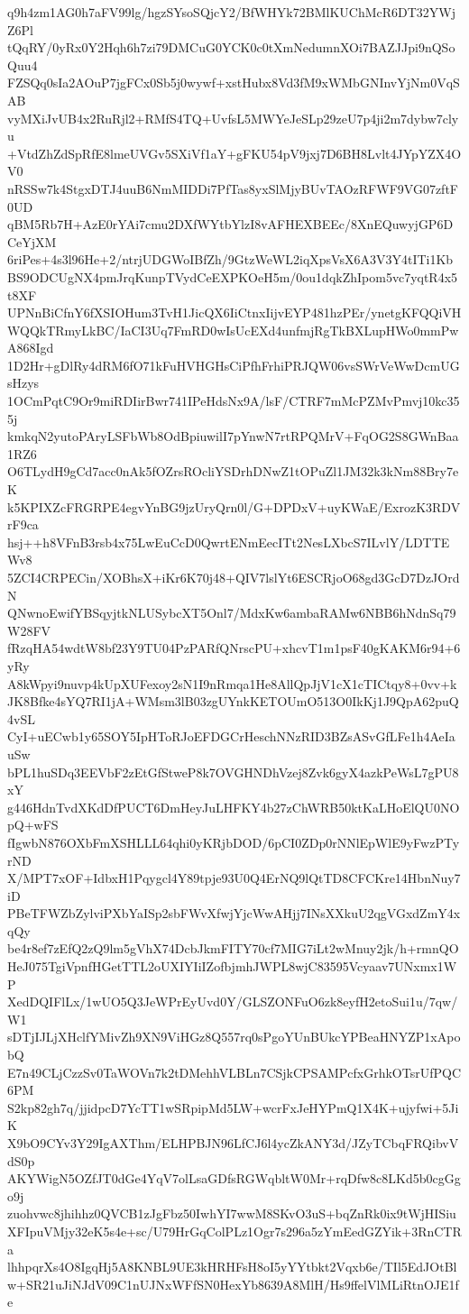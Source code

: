 q9h4zm1AG0h7aFV99lg/hgzSYsoSQjcY2/BfWHYk72BMlKUChMcR6DT32YWjZ6Pl
tQqRY/0yRx0Y2Hqh6h7zi79DMCuG0YCK0c0tXmNedumnXOi7BAZJJpi9nQSoQuu4
FZSQq0sIa2AOuP7jgFCx0Sb5j0wywf+xstHubx8Vd3fM9xWMbGNInvYjNm0VqSAB
vyMXiJvUB4x2RuRjl2+RMfS4TQ+UvfsL5MWYeJeSLp29zeU7p4ji2m7dybw7clyu
+VtdZhZdSpRfE8lmeUVGv5SXiVf1aY+gFKU54pV9jxj7D6BH8Lvlt4JYpYZX4OV0
nRSSw7k4StgxDTJ4uuB6NmMIDDi7PfTas8yxSlMjyBUvTAOzRFWF9VG07zftF0UD
qBM5Rb7H+AzE0rYAi7cmu2DXfWYtbYlzI8vAFHEXBEEc/8XnEQuwyjGP6DCeYjXM
6riPes+4s3l96He+2/ntrjUDGWoIBfZh/9GtzWeWL2iqXpsVsX6A3V3Y4tITi1Kb
BS9ODCUgNX4pmJrqKunpTVydCeEXPKOeH5m/0ou1dqkZhIpom5vc7yqtR4x5t8XF
UPNnBiCfnY6fXSIOHum3TvH1JicQX6IiCtnxIijvEYP481hzPEr/ynetgKFQQiVH
WQQkTRmyLkBC/IaCI3Uq7FmRD0wIsUcEXd4unfmjRgTkBXLupHWo0mmPwA868Igd
1D2Hr+gDlRy4dRM6fO71kFuHVHGHsCiPfhFrhiPRJQW06vsSWrVeWwDcmUGsHzys
1OCmPqtC9Or9miRDIirBwr741IPeHdsNx9A/lsF/CTRF7mMcPZMvPmvj10kc355j
kmkqN2yutoPAryLSFbWb8OdBpiuwilI7pYnwN7rtRPQMrV+FqOG2S8GWnBaa1RZ6
O6TLydH9gCd7acc0nAk5fOZrsROcliYSDrhDNwZ1tOPuZl1JM32k3kNm88Bry7eK
k5KPIXZcFRGRPE4egvYnBG9jzUryQrn0l/G+DPDxV+uyKWaE/ExrozK3RDVrF9ca
hsj++h8VFnB3rsb4x75LwEuCcD0QwrtENmEecITt2NesLXbcS7ILvlY/LDTTEWv8
5ZCI4CRPECin/XOBhsX+iKr6K70j48+QIV7lslYt6ESCRjoO68gd3GcD7DzJOrdN
QNwnoEwifYBSqyjtkNLUSybcXT5Onl7/MdxKw6ambaRAMw6NBB6hNdnSq79W28FV
fRzqHA54wdtW8bf23Y9TU04PzPARfQNrscPU+xhcvT1m1psF40gKAKM6r94+6yRy
A8kWpyi9nuvp4kUpXUFexoy2sN1I9nRmqa1He8AllQpJjV1cX1cTICtqy8+0vv+k
JK8Bfke4sYQ7RI1jA+WMsm3lB03zgUYnkKETOUmO513O0IkKj1J9QpA62puQ4vSL
CyI+uECwb1y65SOY5IpHToRJoEFDGCrHeschNNzRID3BZsASvGfLFe1h4AeIauSw
bPL1huSDq3EEVbF2zEtGfStweP8k7OVGHNDhVzej8Zvk6gyX4azkPeWsL7gPU8xY
g446HdnTvdXKdDfPUCT6DmHeyJuLHFKY4b27zChWRB50ktKaLHoElQU0NOpQ+wFS
fIgwbN876OXbFmXSHLLL64qhi0yKRjbDOD/6pCI0ZDp0rNNlEpWlE9yFwzPTyrND
X/MPT7xOF+IdbxH1Pqygcl4Y89tpje93U0Q4ErNQ9lQtTD8CFCKre14HbnNuy7iD
PBeTFWZbZylviPXbYaISp2sbFWvXfwjYjcWwAHjj7INsXXkuU2qgVGxdZmY4xqQy
be4r8ef7zEfQ2zQ9lm5gVhX74DcbJkmFITY70cf7MIG7iLt2wMnuy2jk/h+rmnQO
HeJ075TgiVpnfHGetTTL2oUXIYIiIZofbjmhJWPL8wjC83595Vcyaav7UNxmx1WP
XedDQIFlLx/1wUO5Q3JeWPrEyUvd0Y/GLSZONFuO6zk8eyfH2etoSui1u/7qw/W1
sDTjIJLjXHclfYMivZh9XN9ViHGz8Q557rq0sPgoYUnBUkcYPBeaHNYZP1xApobQ
E7n49CLjCzzSv0TaWOVn7k2tDMehhVLBLn7CSjkCPSAMPcfxGrhkOTsrUfPQC6PM
S2kp82gh7q/jjidpcD7YcTT1wSRpipMd5LW+wcrFxJeHYPmQ1X4K+ujyfwi+5JiK
X9bO9CYv3Y29IgAXThm/ELHPBJN96LfCJ6l4ycZkANY3d/JZyTCbqFRQibvVdS0p
AKYWigN5OZfJT0dGe4YqV7olLsaGDfsRGWqbltW0Mr+rqDfw8c8LKd5b0cgGgo9j
zuohvwc8jhihhz0QVCB1zJgFbz50IwhYI7wwM8SKvO3uS+bqZnRk0ix9tWjHISiu
XFIpuVMjy32eK5s4e+sc/U79HrGqColPLz1Ogr7s296a5zYmEedGZYik+3RnCTRa
lhhpqrXs4O8IgqHj5A8KNBL9UE3kHRHFsH8oI5yYYtbkt2Vqxb6e/TIl5EdJOtBl
w+SR21uJiNJdV09C1nUJNxWFfSN0HexYb8639A8MlH/Hs9ffelVlMLiRtnOJE1fe
